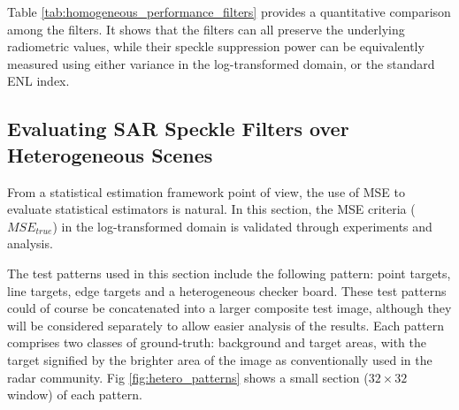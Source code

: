 Table \ref{tab:homogeneous_performance_filters} provides a quantitative comparison among the filters.
It shows that the filters can all preserve the underlying radiometric values, while their speckle suppression power can be equivalently measured using either variance in the log-transformed domain, or the standard ENL index.

\subsection{Evaluating SAR Speckle Filters over Heterogeneous Scenes }
\label{sec:eval_hetero}

From a statistical estimation framework point of view, the use of MSE to evaluate statistical estimators is natural.
In this section, the MSE criteria ($MSE_{true}$) in the log-transformed domain is validated through experiments and analysis. 

%

The test patterns used in this section include the following pattern:
  point targets, line targets, edge targets and a heterogeneous checker board. 
These test patterns could of course be concatenated into a larger composite test image, 
although they will be considered separately to allow easier analysis of the results.
Each pattern comprises two classes of ground-truth: background and target areas,
with the target signified by the brighter area of the image as conventionally used in the 
radar community.
Fig \ref{fig:hetero_patterns} shows a small section ($32 \times 32$ window) of each pattern.

